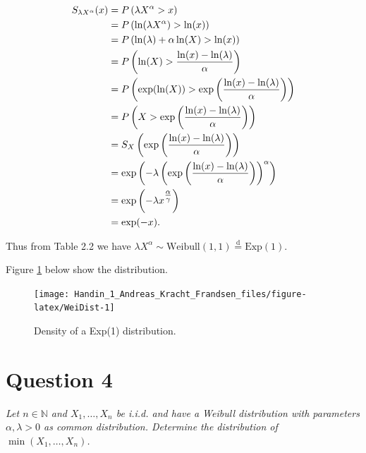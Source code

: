 \documentclass[a4paper,oneside]{memoir}
\begin{document}
\begin{align}
S_{\lambda X^{\alpha}}(x)&=P\left(\lambda X^{\alpha}>x\right) \notag\\
                 &=P\left(\ln(\lambda X^{\alpha})>\ln(x)\right) \notag\\
                 &=P\left(\ln(\lambda)+\alpha\ln(X)>\ln(x)\right) \notag\\
                 &=P\left(\ln(X)>\frac{\ln(x)-\ln(\lambda)}{\alpha}\right) \notag\\
                 &=P\left(\exp(\ln(X))>\exp\left(\frac{\ln(x)-\ln(\lambda)}{\alpha}\right)\right) \notag\\
                 &=P\left(X>\exp\left(\frac{\ln(x)-\ln(\lambda)}{\alpha}\right)\right) \notag\\
                 &=S_X\left(\exp\left(\frac{\ln(x)-\ln(\lambda)}{\alpha}\right)\right) \notag\\
                 &=\exp\left(-\lambda\left(\exp\left(\frac{\ln(x)-\ln(\lambda)}{\alpha}\right)\right)^\alpha\right) \notag\\
                 &=\exp\left(-\lambda x^{\tfrac{\alpha}{\gamma}}\right) \notag\\
                 &=\exp(-x). \label{eq:WeiOneSurv}
\end{align}

Thus from Table 2.2 \citep{Klein2003} we have \(\lambda X^\alpha\sim \text{Weibull}\left(1,1\right) \overset{\text{d}}{=} \text{Exp}(1)\).

Figure \ref{fig:WeiDist} below show the distribution.

\begin{figure}[htbp!]

{\centering \texttt{[image: Handin\_1\_Andreas\_Kracht\_Frandsen\_files/figure-latex/WeiDist-1]} 

}

\caption{Density of a Exp(1) distribution.}\label{fig:WeiDist}
\end{figure}

\hypertarget{question-4}{%
\section{Question 4}\label{question-4}}

\emph{Let \(n\in\mathbb{N}\) and \(X_1,\dots,X_n\) be i.i.d. and have a Weibull distribution with parameters \(\alpha, \lambda > 0\) as common distribution. Determine the distribution of \(\min(X_1,\dots,X_n)\).}
\end{document}
